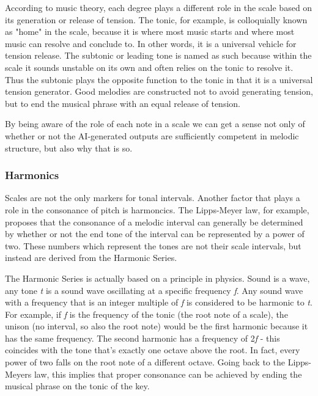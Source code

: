 According to music theory, each degree plays a different role in the scale based on its generation
or release of tension. The tonic, for example, is colloquially known as "home" in the scale,
because it is where most music starts and where most music can resolve and conclude to. In other
words, it is a universal vehicle for tension release. The subtonic or leading tone is named as
such because within the scale it sounds unstable on its own and often relies on the tonic to resolve
it. Thus the subtonic plays the opposite function to the tonic in that it is a universal tension
generator. Good melodies are constructed not to avoid generating tension, but to end the
musical phrase with an equal release of tension.

By being aware of the role of each note in a scale we can get a sense not only of whether or not
the AI-generated outputs are sufficiently competent in melodic structure, but also why that is so.

\subsubsection{Harmonics}

Scales are not the only markers for tonal intervals. Another factor that plays a role in the
consonance of pitch is harmoncics. The Lipps-Meyer law, for example, proposes that the consonance
of a melodic interval can generally be determined by whether or not the end tone of the interval
can be represented by a power of two.\autocite{musiciansArithmetic} These numbers which represent
the tones are not their scale intervals, but instead are derived from the Harmonic Series.

The Harmonic Series is actually based on a principle in physics. Sound is a wave, any tone \textit{t}
is a sound wave oscillating at a specific frequency \textit{f}. Any sound wave with a frequency
that is an integer multiple of \textit{f} is considered to be harmonic to \textit{t}.\autocite{intervals} For example,
if \textit{f} is the frequency of the tonic (the root note of a scale), the unison (no interval,
so also the root note) would be the first harmonic because it has the same frequency. The second
harmonic has a frequency of 2\textit{f} - this coincides with the tone that's exactly one octave
above the root. In fact, every power of two falls on the root note of a different octave. Going
back to the Lipps-Meyers law, this implies that proper consonance can be achieved by ending the
musical phrase on the tonic of the key.


